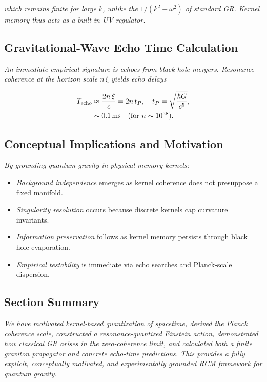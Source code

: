 \textit{which remains finite for large $k$, unlike the $1/(k^2-\omega^2)$ of standard GR.  Kernel memory thus acts as a built‐in UV regulator.}

\subsection{Gravitational‐Wave Echo Time Calculation}

\textit{An immediate empirical signature is echoes from black hole mergers.  Resonance coherence at the horizon scale $n\,\xi$ yields echo delays}

\begin{align}
T_{\rm echo}
&\approx \frac{2n\,\xi}{c}
= 2n\,t_P,
\quad t_P=\sqrt{\frac{\hbar G}{c^5}},
\label{eq:echo_time}\\
&\sim 0.1\,\mathrm{ms}\quad(\text{for }n\sim10^{38}).\nonumber
\end{align}

\subsection{Conceptual Implications and Motivation}

\textit{By grounding quantum gravity in physical memory kernels:}

\begin{itemize}
  \item \emph{Background independence} emerges as kernel coherence does not presuppose a fixed manifold.  
  \item \emph{Singularity resolution} occurs because discrete kernels cap curvature invariants.  
  \item \emph{Information preservation} follows as kernel memory persists through black hole evaporation.  
  \item \emph{Empirical testability} is immediate via echo searches and Planck‐scale dispersion.  
\end{itemize}

\subsection{Section Summary}

\textit{We have motivated kernel‐based quantization of spacetime, derived the Planck coherence scale, constructed a resonance‐quantized Einstein action, demonstrated how classical GR arises in the zero‐coherence limit, and calculated both a finite graviton propagator and concrete echo‐time predictions.  This provides a fully explicit, conceptually motivated, and experimentally grounded RCM framework for quantum gravity.}

